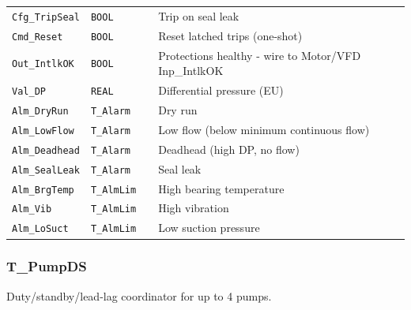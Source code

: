 {\begin{longtable}{@{}>{\raggedright\arraybackslash}p{3.4cm}>{\raggedright\arraybackslash}p{3.3cm}>{\raggedright\arraybackslash}p{1.3cm}>{\raggedright\arraybackslash}p{6.4cm}@{}}
\texttt{Cfg\_TripSeal} & \texttt{BOOL} &  & Trip on seal leak \\
\texttt{Cmd\_Reset} & \texttt{BOOL} &  & Reset latched trips (one-shot) \\
\texttt{Out\_IntlkOK} & \texttt{BOOL} &  & Protections healthy - wire to Motor/\allowbreak{}VFD Inp\_IntlkOK \\
\texttt{Val\_DP} & \texttt{REAL} &  & Differential pressure (EU) \\
\texttt{Alm\_DryRun} & \texttt{T\_Alarm} &  & Dry run \\
\texttt{Alm\_LowFlow} & \texttt{T\_Alarm} &  & Low flow (below minimum continuous flow) \\
\texttt{Alm\_Deadhead} & \texttt{T\_Alarm} &  & Deadhead (high DP, no flow) \\
\texttt{Alm\_SealLeak} & \texttt{T\_Alarm} &  & Seal leak \\
\texttt{Alm\_BrgTemp} & \texttt{T\_AlmLim} &  & High bearing temperature \\
\texttt{Alm\_Vib} & \texttt{T\_AlmLim} &  & High vibration \\
\texttt{Alm\_LoSuct} & \texttt{T\_AlmLim} &  & Low suction pressure \\
\bottomrule
\end{longtable}
}
\subsubsection*{T\_PumpDS}
\label{app:pclib:tpumpds}
Duty/\allowbreak{}standby/\allowbreak{}lead-lag coordinator for up to 4 pumps.

